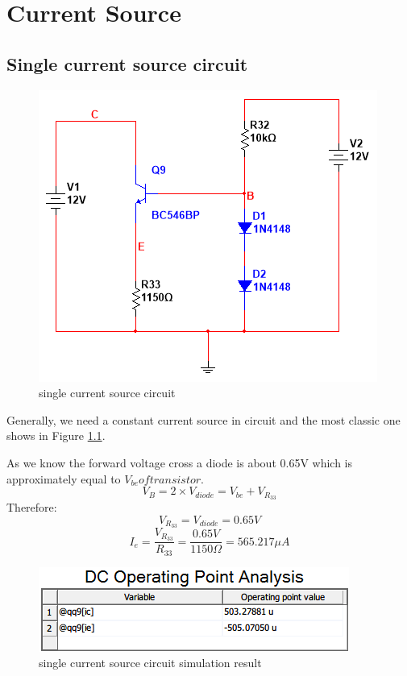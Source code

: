 \chapter{Current Source}
\section{Single current source circuit}



\begin{figure}[htbp]
\centering
\includegraphics[scale =0.6]{"../Photo/Chap1/single current source"}
\caption{single current source circuit}
\label{fig:singlecurrentsource}
\end{figure}

Generally, we need a constant current source in circuit and the most classic one shows in Figure \ref{fig:singlecurrentsource}.

As we know the forward voltage cross a diode is about 0.65V which is approximately equal to $ V_{be} of transistor $. 
\[ V_B = 2 \times V_{diode} = V_{be} + V_{R_{33}}  \]   
Therefore:
\[  V_{R_{33}} = V_{diode} = 0.65V \] 
\[ I_e = \frac{V_{R_{33}}}{R_{33}} = \frac{0.65V}{1150 \Omega} = 565.217 \mu A \]

\begin{figure}[htbp]
\centering
\includegraphics[scale=0.8]{"../Photo/Chap1/single current source simulation result"}
\caption{single current source circuit simulation result}
\label{fig:singlecurrentsourcesimulationresult}
\end{figure}

